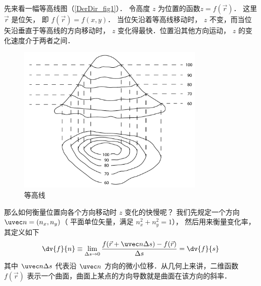 

先来看一幅等高线图（\autoref{DerDir_fig1}）． 令高度 $z$ 为位置的函数$z = f(\vec r)$． 这里 $\vec r$ 是位矢， 即 $f(\vec r) = f(x,y)$． 当位矢沿着等高线移动时， $z$ 不变，而当位矢沿垂直于等高线的方向移动时， $z$ 变化得最快．位置沿其他方向运动， $z$ 的变化速度介于两者之间．

\begin{figure}[ht]
\centering
\includegraphics[width=9cm]{./figures/DerDir1.pdf}
\caption{等高线}\label{DerDir_fig1}
\end{figure}

那么如何衡量位置向各个方向移动时 $z$ 变化的快慢呢？ 我们先规定一个方向 $\uvec n = (n_x,n_y)$（ 平面单位矢量，满足 $n_x^2 + n_y^2 = 1$）， 然后用来衡量变化率，其定义如下
 \begin{equation}
\dv{f}{n} \equiv \lim_{\Delta s \to 0} \frac{f(\vec r + \uvec n\Delta s) - f(\vec r)}{\Delta s} = \dv{f}{s}
\end{equation}
其中 $\uvec n\Delta s$ 代表沿 $\uvec n$ 方向的微小位移．从几何上来讲，二维函数 $f(\vec r)$ 表示一个曲面，曲面上某点的方向导数就是曲面在该方向的斜率．


